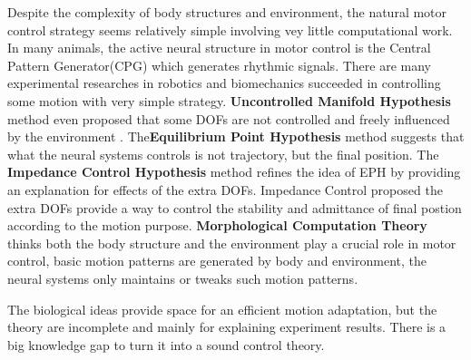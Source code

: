 Despite the complexity of body structures and environment, the natural motor control strategy seems relatively simple involving vey little computational work. In many animals, the active neural structure in motor control is the Central Pattern Generator(CPG) which generates rhythmic signals. There are many experimental researches in robotics and biomechanics succeeded in controlling some motion with very simple strategy\citep{nishikawa2007neuromechanics}. \textbf{Uncontrolled Manifold Hypothesis} method even proposed that some DOFs are not controlled and freely influenced by the environment \citep{latash2008neurophysiological}. The\textbf{Equilibrium Point Hypothesis} method suggests that what the neural systems controls is not trajectory, but the final position. The \textbf{Impedance Control Hypothesis}\citep{hogan1985ica} method refines the idea of EPH by providing an explanation for effects of the extra DOFs. Impedance Control proposed the extra DOFs provide a way to control the stability and admittance of final postion according to the motion purpose. \textbf{Morphological Computation Theory} \citep{nishikawa2007neuromechanics,Pfeifer2005} thinks both the body structure and the environment play a crucial role in  motor control, basic motion patterns are generated by body and environment, the neural systems only  maintains or tweaks such motion patterns.

The biological ideas provide space for an efficient motion adaptation, but the theory are incomplete and mainly for explaining experiment results. There is a big knowledge gap to turn it into a sound control theory.
